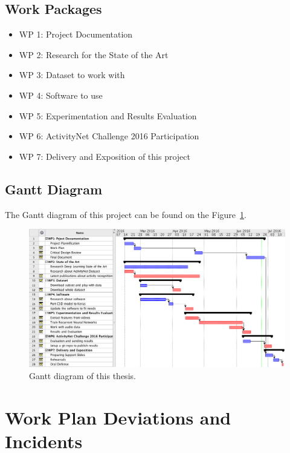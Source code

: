 \subsection{Work Packages}

\begin{itemize}
    \item WP 1: Project Documentation
    \item WP 2: Research for the State of the Art
    \item WP 3: Dataset to work with
    \item WP 4: Software to use
    \item WP 5: Experimentation and Results Evaluation
    \item WP 6: ActivityNet Challenge 2016 Participation
    \item WP 7: Delivery and Exposition of this project
\end{itemize}

\subsection{Gantt Diagram}

The Gantt diagram of this project can be found on the Figure~\ref{fig:gantt_diagram}.

\begin{figure}[H]
\begin{center}
\includegraphics[width=1\linewidth]{img/introduction/gantt_diagram}
\end{center}
\caption{Gantt diagram of this thesis.}
\label{fig:gantt_diagram}
\end{figure}


\section{Work Plan Deviations and Incidents}
\label{section:work_plan_deviations}

